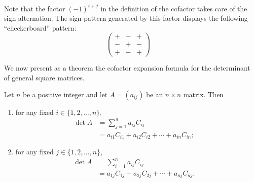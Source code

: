\documentclass{ximera}
\begin{document}
Note that the factor $(-1)^{i+j}$ in the definition of the cofactor
takes care of the sign alternation. The sign pattern generated by this
factor displays the following ``checkerboard'' pattern:
\[
  \begin{pmatrix}
    + & - & + \\
    - & + & - \\
    + & - & +
  \end{pmatrix}
\]

We now present as a theorem the cofactor expansion formula for the
determinant of general square matrices.
\begin{theorem}
  Let $n$ be a positive integer and let $A = (a_{ij})$ be an
  $n \times n$ matrix. Then
  \begin{enumerate}
  \item for any fixed $i \in \{1, 2, \ldots, n\}$,
    \begin{align*}
      \det A
      & = \sum_{j=1}^n a_{ij} C_{ij}
        \tag{cofactor expansion along $i$th row} \\
      & = a_{i1} C_{i1} + a_{i2} C_{i2} + \cdots + a_{in} C_{in};
    \end{align*}
  \item for any fixed $j \in \{1, 2, \ldots, n\}$,
    \begin{align*}
      \det A
      & = \sum_{i=1}^n a_{ij} C_{ij}
        \tag{cofactor expansion along $j$th column} \\
      & = a_{1j} C_{1j} + a_{2j} C_{2j} + \cdots + a_{nj} C_{nj}.
    \end{align*}
  \end{enumerate}
\end{theorem}



\end{document}
